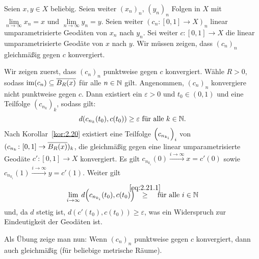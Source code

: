 \begin{beweis}
	Seien $x,y \in X$ beliebig.
	Seien weiter $(x_n)_n$, $(y_n)_n$ Folgen in $X$ mit $\lim\limits_{n \rightarrow \infty} x_n = x$ und $\lim\limits_{n \rightarrow \infty} y_n = y$.
	Seien weiter $(c_n\colon [0,1] \rightarrow X)_n$ linear umparametrisierte Geodäten von $x_n$ nach $y_n$.
	Sei weiter $c \colon [0,1] \rightarrow X$ die linear umparametrisierte Geodäte von $x$ nach $y$.
	Wir müssen zeigen, dass $(c_n)_n$ gleichmäßig gegen $c$ konvergiert.
	
	Wir zeigen zuerst, dass $(c_n)_n$ punktweise gegen $c$ konvergiert.
	Wähle $R > 0$, sodass $\im(c_n) \subseteq \ol{B_R(x)}$ für alle $n \in \NN$ gilt.
	Angenommen, $(c_n)_n$ konvergiere nicht punktweise gegen $c$.
	Dann existiert ein $\varepsilon > 0$ und $t_0 \in (0,1)$ und eine Teilfolge $(c_{n_k})_k$, sodass gilt:
	\begin{equation}
		d(c_{n_k}(t_0),c(t_0)) \geq \varepsilon \text{ für alle } k \in \NN. \label{eq:2.21.1}
	\end{equation}
	Nach Korollar~\ref{kor:2.20} existiert eine Teilfolge $\enbrace*{c_{n_{k_i}}}_i$ von $(c_{n_k}\colon [0,1] \rightarrow \ol{B_R(x)})_k$, die gleichmäßig gegen eine linear umparametrisierte Geodäte $c'\colon [0,1] \rightarrow X$ konvergiert.
	Es gilt $c_{n_{k_i}}(0) \xrightarrow{i \rightarrow \infty} x = c'(0)$ sowie $c_{n_{k_i}}(1) \xrightarrow{i \rightarrow \infty} y = c'(1)$.
	Weiter gilt
	\[
		\lim\limits_{i \rightarrow \infty} d\enbrace*{c_{n_{k_i}}(t_0),c(t_0)} \stack{\eqref{eq:2.21.1}}{\geq} \text{ für alle } i \in \NN
	\]
	und, da $d$ stetig ist, $d(c'(t_0),c(t_0)) \geq \varepsilon$, was ein Widerspruch zur Eindeutigkeit der Geodäten ist.
	
	Als Übung zeige man nun: Wenn $(c_n)_n$ punktweise gegen $c$ konvergiert, dann auch gleichmäßig (für beliebige metrische Räume). 
\end{beweis}


